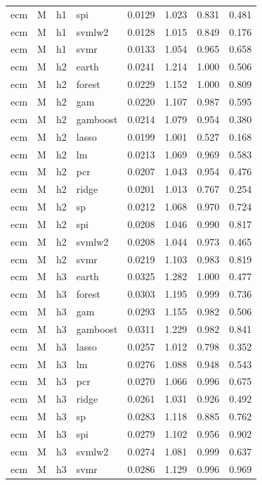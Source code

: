 \begin{ThreePartTable}
\begin{longtable}[t]{llclcccc}
ecm & M & h1 & spi & 0.0129 & 1.023 & 0.831 & 0.481\\
ecm & M & h1 & svmlw2 & 0.0128 & 1.015 & 0.849 & 0.176\\
ecm & M & h1 & svmr & 0.0133 & 1.054 & 0.965 & 0.658\\
\addlinespace
ecm & M & h2 & earth & 0.0241 & 1.214 & 1.000 & 0.506\\
ecm & M & h2 & forest & 0.0229 & 1.152 & 1.000 & 0.809\\
ecm & M & h2 & gam & 0.0220 & 1.107 & 0.987 & 0.595\\
ecm & M & h2 & gamboost & 0.0214 & 1.079 & 0.954 & 0.380\\
ecm & M & h2 & lasso & 0.0199 & 1.001 & 0.527 & 0.168\\
ecm & M & h2 & lm & 0.0213 & 1.069 & 0.969 & 0.583\\
ecm & M & h2 & pcr & 0.0207 & 1.043 & 0.954 & 0.476\\
ecm & M & h2 & ridge & 0.0201 & 1.013 & 0.767 & 0.254\\
ecm & M & h2 & sp & 0.0212 & 1.068 & 0.970 & 0.724\\
ecm & M & h2 & spi & 0.0208 & 1.046 & 0.990 & 0.817\\
ecm & M & h2 & svmlw2 & 0.0208 & 1.044 & 0.973 & 0.465\\
ecm & M & h2 & svmr & 0.0219 & 1.103 & 0.983 & 0.819\\
\addlinespace
ecm & M & h3 & earth & 0.0325 & 1.282 & 1.000 & 0.477\\
ecm & M & h3 & forest & 0.0303 & 1.195 & 0.999 & 0.736\\
ecm & M & h3 & gam & 0.0293 & 1.155 & 0.982 & 0.506\\
ecm & M & h3 & gamboost & 0.0311 & 1.229 & 0.982 & 0.841\\
ecm & M & h3 & lasso & 0.0257 & 1.012 & 0.798 & 0.352\\
ecm & M & h3 & lm & 0.0276 & 1.088 & 0.948 & 0.543\\
ecm & M & h3 & pcr & 0.0270 & 1.066 & 0.996 & 0.675\\
ecm & M & h3 & ridge & 0.0261 & 1.031 & 0.926 & 0.492\\
ecm & M & h3 & sp & 0.0283 & 1.118 & 0.885 & 0.762\\
ecm & M & h3 & spi & 0.0279 & 1.102 & 0.956 & 0.902\\
ecm & M & h3 & svmlw2 & 0.0274 & 1.081 & 0.999 & 0.637\\
ecm & M & h3 & svmr & 0.0286 & 1.129 & 0.996 & 0.969\\

\end{longtable}
\end{ThreePartTable}
